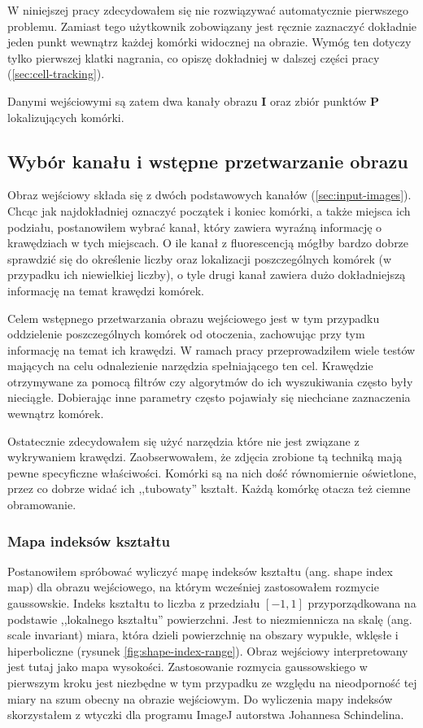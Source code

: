 \documentclass[declaration,shortabstract,mgr]{iithesis}
\newcommand{\image}{\mathbf{I}}
\begin{document}
W niniejszej pracy zdecydowałem się nie rozwiązywać automatycznie pierwszego problemu.
Zamiast tego użytkownik zobowiązany jest ręcznie zaznaczyć dokładnie jeden punkt wewnątrz każdej komórki widocznej na obrazie.
Wymóg ten dotyczy tylko pierwszej klatki nagrania, co opiszę dokładniej w dalszej części pracy (\ref{sec:cell-tracking}).

Danymi wejściowymi są zatem dwa kanały obrazu $\image$ oraz zbiór punktów $\mathbf{P}$ lokalizujących komórki.

\subsection{Wybór kanału i wstępne przetwarzanie obrazu}

Obraz wejściowy składa się z dwóch podstawowych kanałów (\ref{sec:input-images}).
Chcąc jak najdokładniej oznaczyć początek i koniec komórki, a także miejsca ich podziału, postanowiłem wybrać kanał, który zawiera wyraźną informację o krawędziach w tych miejscach.
O ile kanał z fluorescencją mógłby bardzo dobrze sprawdzić się do określenie liczby oraz lokalizacji poszczególnych komórek (w przypadku ich niewielkiej liczby), o tyle drugi kanał zawiera dużo dokładniejszą informację na temat krawędzi komórek.

Celem wstępnego przetwarzania obrazu wejściowego jest w tym przypadku oddzielenie poszczególnych komórek od otoczenia, zachowując przy tym informację na temat ich krawędzi. W ramach pracy przeprowadziłem wiele testów mających na celu odnalezienie narzędzia spełniającego ten cel. Krawędzie otrzymywane za pomocą filtrów czy algorytmów do ich wyszukiwania często były nieciągłe. Dobierając inne parametry często pojawiały się niechciane zaznaczenia wewnątrz komórek.

Ostatecznie zdecydowałem się użyć narzędzia które nie jest związane z wykrywaniem krawędzi. Zaobserwowałem, że zdjęcia zrobione tą techniką mają pewne specyficzne właściwości. Komórki są na nich dość równomiernie oświetlone, przez co dobrze widać ich ,,tubowaty'' kształt. Każdą komórkę otacza też ciemne obramowanie.

\subsubsection{Mapa indeksów kształtu}

Postanowiłem spróbować wyliczyć mapę indeksów kształtu\cite{paper:shape-index} (ang. shape index map) dla obrazu wejściowego, na którym wcześniej zastosowałem rozmycie gaussowskie. Indeks kształtu to liczba z przedziału $[-1, 1]$ przyporządkowana na podstawie ,,lokalnego kształtu'' powierzchni. Jest to niezmiennicza na skalę (ang. scale invariant) miara, która dzieli powierzchnię na obszary wypukłe, wklęsłe i hiperboliczne (rysunek \ref{fig:shape-index-range}). Obraz wejściowy interpretowany jest tutaj jako mapa wysokości. Zastosowanie rozmycia gaussowskiego w pierwszym kroku jest niezbędne w tym przypadku ze względu na nieodporność tej miary na szum obecny na obrazie wejściowym. Do wyliczenia mapy indeksów skorzystałem z wtyczki dla programu ImageJ autorstwa Johannesa Schindelina\cite{plugin:shape-index-map}.
\end{document}
